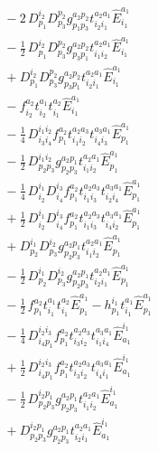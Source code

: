 \documentclass[11pt]{article}
\begin{document}
\begin{align}
&\quad - 2\, D^{i_{2}}_{p_{1}} D^{p_{2}}_{p_{3}} g^{a_{2}p_{2}}_{p_{1}p_{3}} t^{a_{2}a_{1}}_{i_{2}i_{1}} \hat{E}^{a_{1}}_{i_{1}} \\
&\quad - \tfrac{1}{2}\, D^{i_{2}}_{p_{1}} D^{p_{2}}_{p_{3}} g^{a_{2}p_{2}}_{p_{3}p_{1}} t^{a_{2}a_{1}}_{i_{1}i_{2}} \hat{E}^{a_{1}}_{i_{1}} \\
&\quad + D^{i_{2}}_{p_{1}} D^{p_{2}}_{p_{3}} g^{a_{2}p_{2}}_{p_{3}p_{1}} t^{a_{2}a_{1}}_{i_{2}i_{1}} \hat{E}^{a_{1}}_{i_{1}} \\
&\quad - f^{a_{2}}_{i_{2}} t^{a_{1}}_{i_{2}} t^{a_{2}}_{i_{1}} \hat{E}^{a_{1}}_{i_{1}} \\
&\quad - \tfrac{1}{4}\, D^{i_{1}i_{2}}_{i_{3}i_{4}} f^{a_{2}}_{p_{1}} t^{a_{2}a_{3}}_{i_{1}i_{2}} t^{a_{3}a_{1}}_{i_{4}i_{3}} \hat{E}^{a_{1}}_{p_{1}} \\
&\quad - \tfrac{1}{2}\, D^{i_{1}i_{2}}_{p_{2}p_{3}} g^{a_{2}p_{1}}_{p_{2}p_{3}} t^{a_{2}a_{1}}_{i_{1}i_{2}} \hat{E}^{a_{1}}_{p_{1}} \\
&\quad - \tfrac{1}{4}\, D^{i_{1}}_{i_{2}} D^{i_{3}}_{i_{4}} f^{a_{2}}_{p_{1}} t^{a_{2}a_{3}}_{i_{1}i_{3}} t^{a_{3}a_{1}}_{i_{2}i_{4}} \hat{E}^{a_{1}}_{p_{1}} \\
&\quad + \tfrac{1}{2}\, D^{i_{1}}_{i_{2}} D^{i_{3}}_{i_{4}} f^{a_{2}}_{p_{1}} t^{a_{2}a_{3}}_{i_{1}i_{3}} t^{a_{3}a_{1}}_{i_{4}i_{2}} \hat{E}^{a_{1}}_{p_{1}} \\
&\quad + D^{i_{1}}_{p_{2}} D^{i_{2}}_{p_{3}} g^{a_{2}p_{1}}_{p_{2}p_{3}} t^{a_{2}a_{1}}_{i_{1}i_{2}} \hat{E}^{a_{1}}_{p_{1}} \\
&\quad - \tfrac{1}{2}\, D^{i_{1}}_{p_{2}} D^{i_{2}}_{p_{3}} g^{a_{2}p_{1}}_{p_{2}p_{3}} t^{a_{2}a_{1}}_{i_{2}i_{1}} \hat{E}^{a_{1}}_{p_{1}} \\
&\quad - \tfrac{1}{2}\, f^{a_{2}}_{p_{1}} t^{a_{1}}_{i_{1}} t^{a_{2}}_{i_{1}} \hat{E}^{a_{1}}_{p_{1}} - h^{i_{1}}_{p_{1}} t^{a_{1}}_{i_{1}} \hat{E}^{a_{1}}_{p_{1}} \\
&\quad - \tfrac{1}{4}\, D^{i_{2}i_{3}}_{i_{4}p_{1}} f^{a_{2}}_{p_{1}} t^{a_{2}a_{3}}_{i_{3}i_{2}} t^{a_{3}a_{1}}_{i_{1}i_{4}} \hat{E}^{i_{1}}_{a_{1}} \\
&\quad + \tfrac{1}{2}\, D^{i_{2}i_{3}}_{i_{4}p_{1}} f^{a_{2}}_{p_{1}} t^{a_{2}a_{3}}_{i_{3}i_{2}} t^{a_{3}a_{1}}_{i_{4}i_{1}} \hat{E}^{i_{1}}_{a_{1}} \\
&\quad - \tfrac{1}{2}\, D^{i_{2}p_{1}}_{p_{2}p_{3}} g^{a_{2}p_{1}}_{p_{2}p_{3}} t^{a_{2}a_{1}}_{i_{1}i_{2}} \hat{E}^{i_{1}}_{a_{1}} \\
&\quad + D^{i_{2}p_{1}}_{p_{2}p_{3}} g^{a_{2}p_{1}}_{p_{2}p_{3}} t^{a_{2}a_{1}}_{i_{2}i_{1}} \hat{E}^{i_{1}}_{a_{1}} \\

\end{align}
\end{document}
